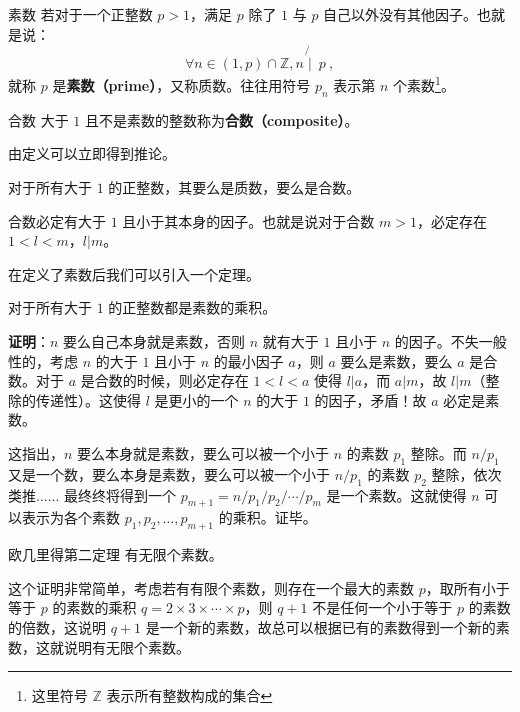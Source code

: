 
\begin{definition}{素数}
若对于一个正整数 $p > 1$，满足 $p$ 除了 $1$ 与 $p$ 自己以外没有其他因子。也就是说：
\begin{equation}
\forall n \in (1,p) \cap \mathbb Z, n \not{\mid} ~ p ~,
\end{equation}
就称 $p$ 是\textbf{素数（prime）}，又称质数。往往用符号 $p_n$ 表示第 $n$ 个素数\footnote{这里符号 $\mathbb Z$ 表示所有整数构成的集合}。
\end{definition}

\begin{definition}{合数}
大于 $1$ 且不是素数的整数称为\textbf{合数（composite）}。
\end{definition}

由定义可以立即得到推论。
\begin{corollary}{}
对于所有大于 $1$ 的正整数，其要么是质数，要么是合数。
\end{corollary}
\begin{corollary}{}
合数必定有大于 $1$ 且小于其本身的因子。也就是说对于合数 $m > 1$，必定存在 $1 < l < m$，$l | m$。
\end{corollary}



在定义了素数后我们可以引入一个定理。
\begin{theorem}{}\label{the_prmnt_1}
对于所有大于 $1$ 的正整数都是素数的乘积。
\end{theorem}
\textbf{证明}：$n$ 要么自己本身就是素数，否则 $n$ 就有大于 $1$ 且小于 $n$ 的因子。不失一般性的，考虑 $n$ 的大于 $1$ 且小于 $n$ 的最小因子 $a$，则 $a$ 要么是素数，要么 $a$ 是合数。对于 $a$ 是合数的时候，则必定存在 $1 < l < a$ 使得 $l | a$，而 $a | m$，故 $l|m$（整除的传递性）。这使得 $l$ 是更小的一个 $n$ 的大于 $1$ 的因子，矛盾！故 $a$ 必定是素数。

这指出，$n$ 要么本身就是素数，要么可以被一个小于 $n$ 的素数 $p_1$ 整除。而 $n / p_1$ 又是一个数，要么本身是素数，要么可以被一个小于 $n / p_1$ 的素数 $p_2$ 整除，依次类推...... 最终终将得到一个 $p_{m+1} = n/ p_1 / p_2 / \cdots / p_m$ 是一个素数。这就使得 $n$ 可以表示为各个素数 $p_1, p_2, \dots, p_{m+1}$ 的乘积。证毕。

\begin{theorem}{欧几里得第二定理}
有无限个素数。
\end{theorem}
这个证明非常简单，考虑若有有限个素数，则存在一个最大的素数 $p$，取所有小于等于 $p$ 的素数的乘积 $q = 2 \times 3 \times \cdots \times p$，则 $q+1$ 不是任何一个小于等于 $p$ 的素数的倍数，这说明 $q+1$ 是一个新的素数，故总可以根据已有的素数得到一个新的素数，这就说明有无限个素数。

